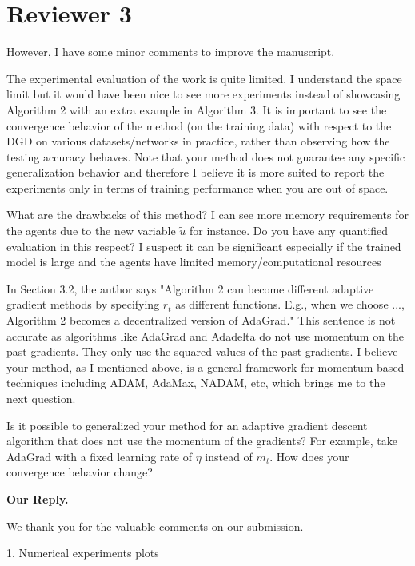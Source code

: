\documentclass{article} %
\begin{document}
\section{Reviewer 3}
\vspace{-0.1in}

However, I have some minor comments to improve the manuscript.

The experimental evaluation of the work is quite limited. I understand the space limit but it would have been nice to see more experiments instead of showcasing Algorithm 2 with an extra example in Algorithm 3. It is important to see the convergence behavior of the method (on the training data) with respect to the DGD on various datasets/networks in practice, rather than observing how the testing accuracy behaves. 
Note that your method does not guarantee any specific generalization behavior and therefore I believe it is more suited to report the experiments only in terms of training performance when you are out of space.

What are the drawbacks of this method? I can see more memory requirements for the agents due to the new variable $\tilde{u}$ for instance. Do you have any quantified evaluation in this respect? I suspect it can be significant especially if the trained model is large and the agents have limited memory/computational resources

In Section 3.2, the author says "Algorithm 2 can become different adaptive gradient methods by specifying $r_t$ as different functions. E.g., when we choose ..., Algorithm 2 becomes a decentralized version of AdaGrad." This sentence is not accurate as algorithms like AdaGrad and Adadelta do not use momentum on the past gradients. They only use the squared values of the past gradients. I believe your method, as I mentioned above, is a general framework for momentum-based techniques including ADAM, AdaMax, NADAM, etc, which brings me to the next question.

Is it possible to generalized your method for an adaptive gradient descent algorithm that does not use the momentum of the gradients? For example, take AdaGrad with a fixed learning rate of $\eta$ instead of $m_t$. How does your convergence behavior change?

\textbf{Our Reply.}

We thank you for the valuable comments on our submission.


1. Numerical experiments plots
\end{document}
